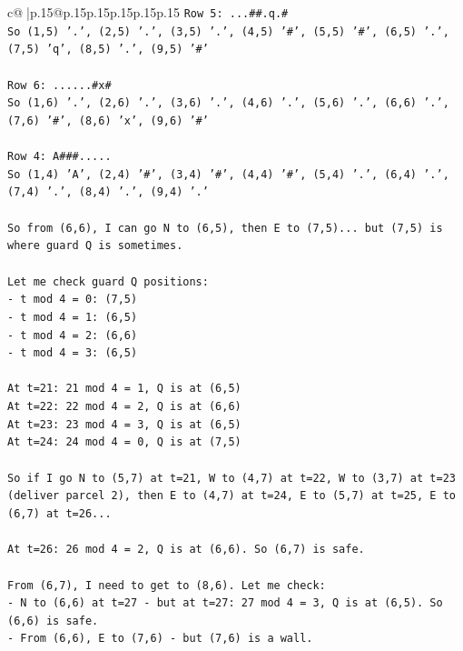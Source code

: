 \documentclass{article}
\begin{document}
{\begin{supertabular}{c@{$\;$}|p{.15\linewidth}@{}p{.15\linewidth}p{.15\linewidth}p{.15\linewidth}p{.15\linewidth}p{.15\linewidth}}
{{{\texttt{Row 5: ...\#\#.q.\#} \\
\texttt{So (1,5) '.', (2,5) '.', (3,5) '.', (4,5) '\#', (5,5) '\#', (6,5) '.', (7,5) 'q', (8,5) '.', (9,5) '\#'} \\
\\ 
\texttt{Row 6: ......\#x\#} \\
\texttt{So (1,6) '.', (2,6) '.', (3,6) '.', (4,6) '.', (5,6) '.', (6,6) '.', (7,6) '\#', (8,6) 'x', (9,6) '\#'} \\
\\ 
\texttt{Row 4: A\#\#\#.....} \\
\texttt{So (1,4) 'A', (2,4) '\#', (3,4) '\#', (4,4) '\#', (5,4) '.', (6,4) '.', (7,4) '.', (8,4) '.', (9,4) '.'} \\
\\ 
\texttt{So from (6,6), I can go N to (6,5), then E to (7,5)... but (7,5) is where guard Q is sometimes.} \\
\\ 
\texttt{Let me check guard Q positions:} \\
\texttt{{-} t mod 4 = 0: (7,5)} \\
\texttt{{-} t mod 4 = 1: (6,5)} \\
\texttt{{-} t mod 4 = 2: (6,6)} \\
\texttt{{-} t mod 4 = 3: (6,5)} \\
\\ 
\texttt{At t=21: 21 mod 4 = 1, Q is at (6,5)} \\
\texttt{At t=22: 22 mod 4 = 2, Q is at (6,6)} \\
\texttt{At t=23: 23 mod 4 = 3, Q is at (6,5)} \\
\texttt{At t=24: 24 mod 4 = 0, Q is at (7,5)} \\
\\ 
\texttt{So if I go N to (5,7) at t=21, W to (4,7) at t=22, W to (3,7) at t=23 (deliver parcel 2), then E to (4,7) at t=24, E to (5,7) at t=25, E to (6,7) at t=26...} \\
\\ 
\texttt{At t=26: 26 mod 4 = 2, Q is at (6,6). So (6,7) is safe.} \\
\\ 
\texttt{From (6,7), I need to get to (8,6). Let me check:} \\
\texttt{{-} N to (6,6) at t=27 {-} but at t=27: 27 mod 4 = 3, Q is at (6,5). So (6,6) is safe.} \\
\texttt{{-} From (6,6), E to (7,6) {-} but (7,6) is a wall.} \\
\\ 
}}}
\end{supertabular}}
\end{document}
